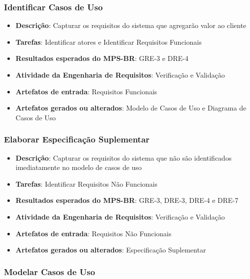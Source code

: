 \subsubsection{Identificar Casos de Uso}

\begin{itemize}
\item \textbf{Descrição}: Capturar os requisitos do sistema que agregarão valor ao cliente
\item \textbf{Tarefas}: Identificar atores e Identificar Requisitos Funcionais
\item \textbf{Resultados esperados do MPS-BR}: GRE-3 e DRE-4
\item \textbf{Atividade da Engenharia de Requisitos}: Verificação e Validação
\item \textbf{Artefatos de entrada}: Requisitos Funcionais
\item \textbf{Artefatos gerados ou alterados}: Modelo de Casos de Uso e Diagrama de Casos de Uso
\end{itemize}

\subsubsection{Elaborar Especificação Suplementar}

\begin{itemize}
\item \textbf{Descrição}: Capturar os requisitos do sistema que não são identificados imediatamente no modelo de casos de uso
\item \textbf{Tarefas}: Identificar Requisitos Não Funcionais
\item \textbf{Resultados esperados do MPS-BR}: GRE-3, DRE-3, DRE-4 e DRE-7
\item \textbf{Atividade da Engenharia de Requisitos}: Verificação e Validação
\item \textbf{Artefatos de entrada}: Requisitos Não Funcionais
\item \textbf{Artefatos gerados ou alterados}: Especificação Suplementar
\end{itemize}

\subsubsection{Modelar Casos de Uso}

